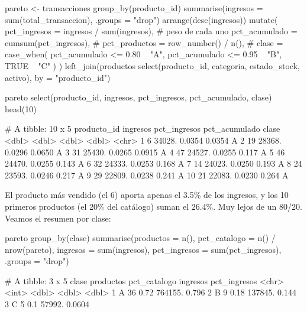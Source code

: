 \begin{rcode}
pareto <- transacciones %
  group_by(producto_id) %
  summarise(ingresos = sum(total_transaccion), .groups = "drop") %
  arrange(desc(ingresos)) %
  mutate(
    pct_ingresos  = ingresos / sum(ingresos),        # peso de cada uno
    pct_acumulado = cumsum(pct_ingresos),            # %
    pct_productos = row_number() / n(),              # %
    clase = case_when(
      pct_acumulado <= 0.80 ~ "A",
      pct_acumulado <= 0.95 ~ "B",
      TRUE                  ~ "C"
    )
  ) %
  left_join(productos %
              select(producto_id, categoria, estado_stock, activo),
            by = "producto_id")

pareto %
  select(producto_id, ingresos, pct_ingresos, pct_acumulado, clase) %
  head(10)
\end{rcode}
\begin{rsalida}
# A tibble: 10 x 5
   producto_id ingresos pct_ingresos pct_acumulado clase
         <dbl>    <dbl>        <dbl>         <dbl> <chr>
 1           6   34028.       0.0354        0.0354 A
 2          19   28368.       0.0296        0.0650 A
 3          31   25430.       0.0265        0.0915 A
 4          47   24527.       0.0255        0.117  A
 5          46   24470.       0.0255        0.143  A
 6          32   24333.       0.0253        0.168  A
 7          14   24023.       0.0250        0.193  A
 8          24   23593.       0.0246        0.217  A
 9          29   22809.       0.0238        0.241  A
10          21   22083.       0.0230        0.264  A
\end{rsalida}

El producto más vendido (el 6) aporta apenas el 3.5\% de los ingresos, y los
10 primeros productos (el 20\% del catálogo) suman el 26.4\%. Muy lejos de
un 80/20. Veamos el resumen por clase:

\begin{rcode}
pareto %
  group_by(clase) %
  summarise(productos     = n(),
            pct_catalogo  = n() / nrow(pareto),
            ingresos      = sum(ingresos),
            pct_ingresos  = sum(pct_ingresos),
            .groups = "drop")
\end{rcode}
\begin{rsalida}
# A tibble: 3 x 5
  clase productos pct_catalogo ingresos pct_ingresos
  <chr>     <int>        <dbl>    <dbl>        <dbl>
1 A            36         0.72  764155.       0.796
2 B             9         0.18  137845.       0.144
3 C             5         0.1    57992.       0.0604
\end{rsalida}

